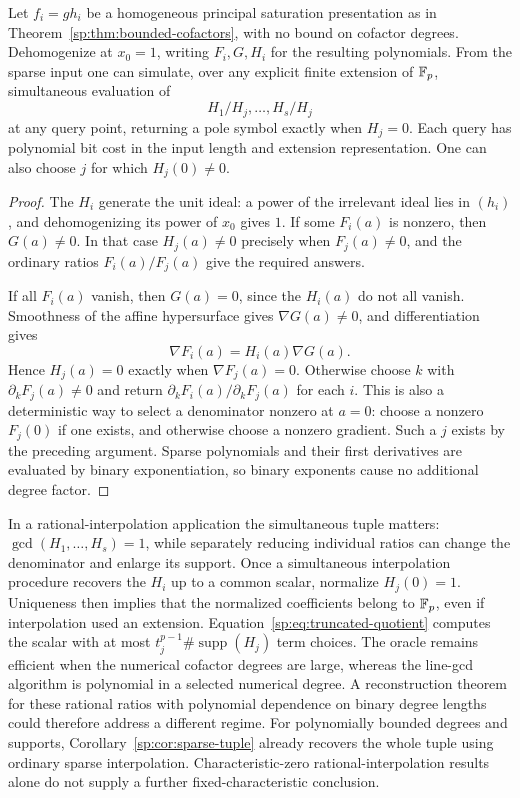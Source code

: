 \begin{lemma}
\label{sp:lem:cofactor-oracle}
Let $f_i=g h_i$ be a homogeneous principal saturation presentation as
in Theorem~\ref{sp:thm:bounded-cofactors}, with no bound on cofactor
degrees. Dehomogenize at $x_0=1$, writing $F_i,G,H_i$ for the resulting
polynomials. From the sparse input one can simulate, over any explicit
finite extension of $\mathbb F_p$, simultaneous evaluation of
\[
 H_1/H_j,\ldots,H_s/H_j
\]
at any query point, returning a pole symbol exactly when $H_j=0$.
Each query has polynomial bit cost in the input length and extension
representation. One can also choose $j$ for which $H_j(0)\ne0$.
\end{lemma}
\begin{proof}
The $H_i$ generate the unit ideal: a power of the irrelevant ideal
lies in $(h_i)$, and dehomogenizing its power of $x_0$ gives $1$.
If some $F_i(a)$ is nonzero, then $G(a)\ne0$. In that case
$H_j(a)\ne0$ precisely when $F_j(a)\ne0$, and the ordinary ratios
$F_i(a)/F_j(a)$ give the required answers.

If all $F_i(a)$ vanish, then $G(a)=0$, since the $H_i(a)$ do not all
vanish. Smoothness of the affine hypersurface gives
$\nabla G(a)\ne0$, and differentiation gives
\[
 \nabla F_i(a)=H_i(a)\nabla G(a).
\]
Hence $H_j(a)=0$ exactly when $\nabla F_j(a)=0$. Otherwise choose
$k$ with $\partial_kF_j(a)\ne0$ and return
$\partial_kF_i(a)/\partial_kF_j(a)$ for each $i$.
This is also a deterministic way to select a denominator nonzero at
$a=0$: choose a nonzero $F_j(0)$ if one exists, and otherwise choose a
nonzero gradient. Such a $j$ exists by the preceding argument.
Sparse polynomials and their first derivatives are evaluated by binary
exponentiation, so binary exponents cause no additional degree factor.
\end{proof}

In a rational-interpolation application the simultaneous tuple matters:
$\gcd(H_1,\ldots,H_s)=1$, while separately reducing individual ratios
can change the denominator and enlarge its support. Once a simultaneous
interpolation procedure recovers the $H_i$ up to a common scalar,
normalize $H_j(0)=1$. Uniqueness then implies that the normalized
coefficients belong to $\mathbb F_p$, even if interpolation used an extension.
Equation~\eqref{sp:eq:truncated-quotient} computes the scalar with at
most $t_j^{p-1}\#\operatorname{supp}(H_j)$ term choices.
The oracle remains efficient when the numerical cofactor degrees are
large, whereas the line-gcd algorithm is polynomial in a selected
numerical degree. A reconstruction theorem for these rational ratios
with polynomial dependence on binary degree lengths could therefore
address a different regime. For polynomially bounded degrees and
supports, Corollary~\ref{sp:cor:sparse-tuple} already recovers the
whole tuple using ordinary sparse interpolation. Characteristic-zero
rational-interpolation results alone do not supply a further
fixed-characteristic conclusion.


